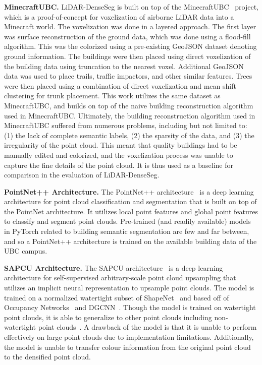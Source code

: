 \documentclass[10pt,twocolumn,letterpaper]{article}
\begin{document}
    \textbf{MinecraftUBC.} LiDAR-DenseSeg is built on top of the MinecraftUBC~\cite{MinecraftUBC} project, which is a proof-of-concept for voxelization of airborne LiDAR data into a Minecraft world.
    The voxelization was done in a layered approach.
    The first layer was surface reconstruction of the ground data, which was done using a flood-fill algorithm.
    This was the colorized using a pre-existing GeoJSON dataset denoting ground information.
    The buildings were then placed using direct voxelization of the building data using truncation to the nearest voxel.
    Additional GeoJSON data was used to place trails, traffic impactors, and other similar features.
    Trees were then placed using a combination of direct voxelization and mean shift clustering for trunk placement.
    This work utilizes the same dataset as MinecraftUBC, and builds on top of the naive building reconstruction algorithm used in MinecraftUBC\@.
    Ultimately, the building reconstruction algorithm used in MinecraftUBC suffered from numerous problems, including but not limited to: (1) the lack of complete semantic labels, (2) the sparsity of the data, and (3) the irregularity of the point cloud.
    This meant that quality buildings had to be manually edited and colorized, and the voxelization process was unable to capture the fine details of the point cloud.
    It is thus used as a baseline for comparison in the evaluation of LiDAR-DenseSeg.

    \textbf{PointNet++ Architecture.} The PointNet++ architecture~\cite{qi2017pointnet} is a deep learning architecture for point cloud classification and segmentation that is built on top of the PointNet architecture.
    It utilizes local point features and global point features to classify and segment point clouds.
    Pre-trained (and readily available) models in PyTorch related to building semantic segmentation are few and far between, and so a PointNet++ architecture is trained on the available building data of the UBC campus.

    \textbf{SAPCU Architecture.} The SAPCU architecture~\cite{sapcu} is a deep learning architecture for self-supervised arbitrary-scale point cloud upsampling that utilizes an implicit neural representation to upsample point clouds.
    The model is trained on a normalized watertight subset of ShapeNet~\cite{chang2015shapenet, Occupancy_Networks} and based off of Occupancy Networks~\cite{Occupancy_Networks} and DGCNN~\cite{dgcnn}.
    Though the model is trained on watertight point clouds, it is able to generalize to other point clouds including non-watertight point clouds~\cite{sapcu}.
    A drawback of the model is that it is unable to perform effectively on large point clouds due to implementation limitations.
    Additionally, the model is unable to transfer colour information from the original point cloud to the densified point cloud.
\end{document}
